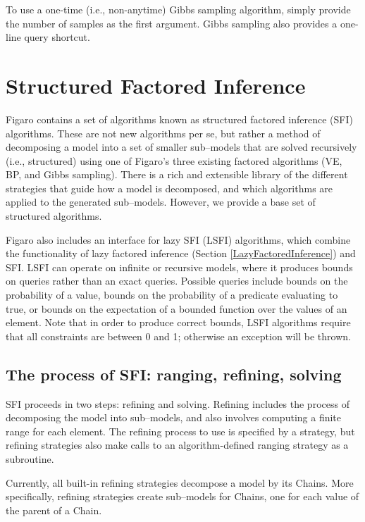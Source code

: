 To use a one-time (i.e., non-anytime) Gibbs sampling algorithm, simply provide the number of samples as the first argument. Gibbs sampling also provides a one-line query shortcut.

\section{Structured Factored Inference}

Figaro contains a set of algorithms known as structured factored inference (SFI) algorithms. These are not new algorithms per se, but rather a method of decomposing a model into a set of smaller sub--models that are solved recursively (i.e., structured) using one of Figaro's three existing factored algorithms (VE, BP, and Gibbs sampling). There is a rich and extensible library of the different strategies that guide how a model is decomposed, and which algorithms are applied to the generated sub--models. However, we provide a base set of structured algorithms.

Figaro also includes an interface for lazy SFI (LSFI) algorithms, which combine the functionality of lazy factored inference (Section \ref{LazyFactoredInference}) and SFI. LSFI can operate on infinite or recursive models, where it produces bounds on queries rather than an exact queries. Possible queries include bounds on the probability of a value, bounds on the probability of a predicate evaluating to true, or bounds on the expectation of a bounded function over the values of an element. Note that in order to produce correct bounds, LSFI algorithms require that all constraints are between 0 and 1; otherwise an exception will be thrown.

\subsection{The process of SFI: ranging, refining, solving}

SFI proceeds in two steps: refining and solving. Refining includes the process of decomposing the model into sub--models, and also involves computing a finite range for each element. The refining process to use is specified by a strategy, but refining strategies also make calls to an algorithm-defined ranging strategy as a subroutine.

Currently, all built-in refining strategies decompose a model by its Chains. More specifically, refining strategies create sub--models for Chains, one for each value of the parent of a Chain.

